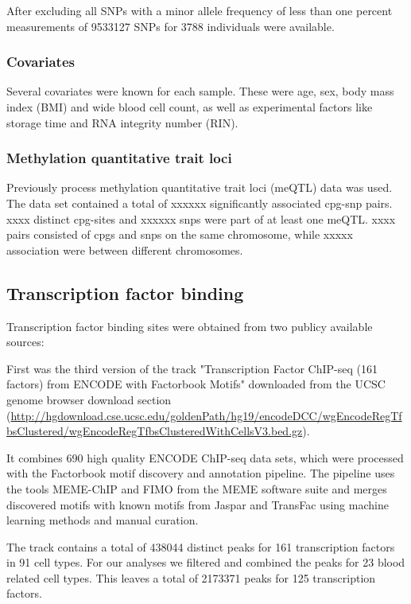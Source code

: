 \documentclass[a4paper,12pt]{article}
\begin{document}
After excluding all SNPs with a minor allele frequency of less than one percent measurements of 9533127 SNPs for 3788 individuals were available. 

\subsubsection{Covariates}
Several covariates were known for each sample. These were age, sex, body mass index (BMI) and wide blood cell count, as well as experimental factors like storage time and RNA integrity number (RIN).

\subsubsection{Methylation quantitative trait loci}
Previously process methylation quantitative trait loci (meQTL) data was used. The data set contained a total of xxxxxx significantly associated cpg-snp pairs. 
xxxx distinct cpg-sites and xxxxxx snps were part of at least one meQTL. xxxx pairs consisted of cpgs and snps on the same chromosome, while xxxxx association were between different chromosomes. 

\subsection{Transcription factor binding}
Transcription factor binding sites were obtained from two publicy available sources: 

First was the third version of the track "Transcription Factor ChIP-seq (161 factors) from ENCODE with Factorbook Motifs"\cite{10.1101/gr.139105.112} downloaded from the UCSC genome browser download section (\url{http://hgdownload.cse.ucsc.edu/goldenPath/hg19/encodeDCC/wgEncodeRegTfbsClustered/wgEncodeRegTfbsClusteredWithCellsV3.bed.gz}).

It combines 690 high quality ENCODE ChIP-seq data sets, which were processed with the Factorbook motif discovery and annotation pipeline\cite{10.1101/gr.139105.112}. The pipeline uses the tools MEME-ChIP\cite{10.1093/bioinformatics/btr189} and FIMO\cite{10.1093/bioinformatics/btr064} from the MEME software suite and merges discovered motifs with known motifs from Jaspar\cite{10.1093/nar/gkx1126} and TransFac\cite{10.1093/nar/gkj143} using machine learning methods and manual curation. 

The track contains a total of 438044 distinct peaks for 161 transcription factors in 91 cell types. For our analyses we filtered and combined the peaks for 23 blood related cell types. This leaves a total of 2173371 peaks for 125 transcription factors.  
\end{document}

